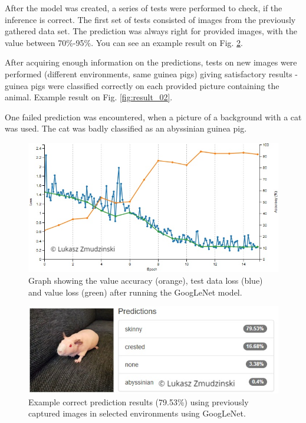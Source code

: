 \documentclass[10pt,journal,compsoc]{IEEEtran}
\begin{document}
    After the model was created, a series of tests were performed to check, if the inference is correct. The first set of tests consisted of images from the previously gathered data set. The prediction was always right for provided images, with the value between 70\%-95\%. You can see an example result on Fig. \ref{fig:result_01}.

    After acquiring enough information on the predictions, tests on new images were performed (different environments, same guinea pigs) giving satisfactory results - guinea pigs were classified correctly on each provided picture containing the animal. Example result on Fig. \ref{fig:result_02}.

    One failed prediction was encountered, when a picture of a background with a cat was used. The cat was badly classified as an abyssinian guinea pig.

    \begin{figure}[h]
        \includegraphics[width=\linewidth]{googlenet.png}
        \caption{Graph showing the value accuracy (orange), test data loss (blue) and value loss (green) after running the GoogLeNet model.}
        \label{fig:googlenet}
        \centering
    \end{figure}

    \begin{figure}[h]
        \includegraphics[width=\linewidth]{result_01.png}
        \caption{Example correct prediction results (79.53\%) using previously captured images in selected environments using GoogLeNet.}
        \label{fig:result_01}
        \centering
    \end{figure}
\end{document}
